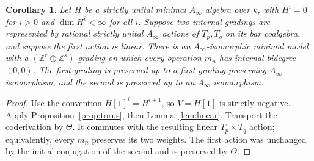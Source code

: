 \documentclass[12pt,a4paper,english,reqno]{amsart}
\theoremstyle{plain}
\newtheorem{cor}[thm]{Corollary}
\theoremstyle{definition}
\numberwithin{equation}{section}
\newcommand{\prpref}[1]{Proposition~\ref{#1}}
\newcommand{\lemref}[1]{Lemma~\ref{#1}}
\def\Th{\Theta}
\def\bbZ{{\mathbb Z}}
\def\ds{\oplus}
\def\Ainf{A_\infty}
\begin{document}
\begin{cor}\label{cor:common}
Let $H$ be a strictly unital minimal $\Ainf$ algebra over $k$, with $H^i=0$ for $i>0$ and $\dim H^i<\infty$ for all $i$. Suppose two internal gradings are represented by rational strictly unital $\Ainf$ actions of $T_p,T_q$ on its bar coalgebra, and suppose the first action is linear. There is an $\Ainf$-isomorphic minimal model with a $(\bbZ^r\ds\bbZ^s)$-grading on which every operation $m_n$ has internal bidegree $(0,0)$. The first grading is preserved up to a first-grading-preserving $\Ainf$ isomorphism, and the second is preserved up to an $\Ainf$ isomorphism.
\end{cor}
\begin{proof}
Use the convention $H[1]^i=H^{i+1}$, so $V=H[1]$ is strictly negative. Apply \prpref{prop:torus}, then \lemref{lem:linear}. Transport the coderivation by $\Th$. It commutes with the resulting linear $T_p\times T_q$ action; equivalently, every $m_n$ preserves its two weights. The first action was unchanged by the initial conjugation of the second and is preserved by $\Th$.
\end{proof}
\end{document}
